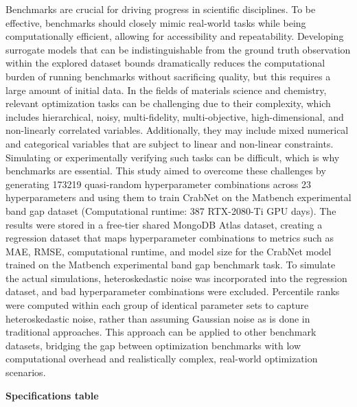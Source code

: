 Benchmarks are crucial for driving progress in scientific disciplines.
To be effective, benchmarks should closely mimic real-world tasks while
being computationally efficient, allowing for accessibility and
repeatability. Developing surrogate models that can be indistinguishable
from the ground truth observation within the explored dataset bounds
dramatically reduces the computational burden of running benchmarks
without sacrificing quality, but this requires a large amount of initial
data. In the fields of materials science and chemistry, relevant
optimization tasks can be challenging due to their complexity, which
includes hierarchical, noisy, multi-fidelity, multi-objective,
high-dimensional, and non-linearly correlated variables. Additionally,
they may include mixed numerical and categorical variables that are
subject to linear and non-linear constraints. Simulating or
experimentally verifying such tasks can be difficult, which is why
benchmarks are essential. This study aimed to overcome these challenges
by generating 173219 quasi-random hyperparameter combinations across 23
hyperparameters and using them to train CrabNet on the Matbench
experimental band gap dataset (Computational runtime: 387 RTX-2080-Ti
GPU days). The results were stored in a free-tier shared MongoDB Atlas
dataset, creating a regression dataset that maps hyperparameter
combinations to metrics such as MAE, RMSE, computational runtime, and
model size for the CrabNet model trained on the Matbench experimental
band gap benchmark task. To simulate the actual simulations,
heteroskedastic noise was incorporated into the regression dataset, and
bad hyperparameter combinations were excluded. Percentile ranks were
computed within each group of identical parameter sets to capture
heteroskedastic noise, rather than assuming Gaussian noise as is done in
traditional approaches. This approach can be applied to other benchmark
datasets, bridging the gap between optimization benchmarks with low
computational overhead and realistically complex, real-world
optimization scenarios.

\textbf{Specifications table}

